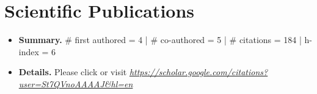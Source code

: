 \documentclass[11pt,letterpaper,sans]{moderncv}        %
\begin{document}
 



\section{Scientific Publications}

 
\begin{itemize}

\item{\textbf{Summary.} \# first authored = 4 | \# co-authored = 5 | \# citations = 184 |  h-index = 6}
\item{\textbf{Details.} Please click or visit \href{https://scholar.google.com/citations?user=St7QVnoAAAAJ\&hl=en}{\textit{https://scholar.google.com/citations?user=St7QVnoAAAAJ\&hl=en}}}


\end{itemize}



\nocite{*}



\end{document}
